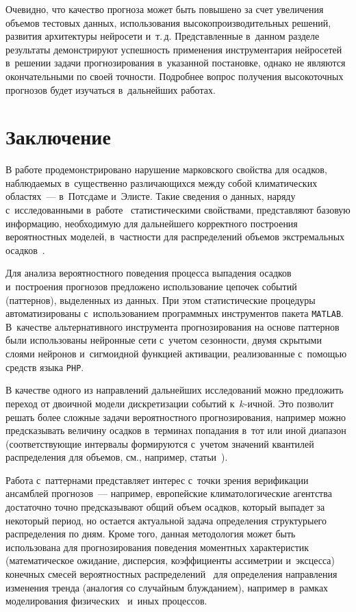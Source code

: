 \begin{multicols}{2}
Очевидно, что качество прогноза может быть повышено за счет увеличения
объемов тестовых данных, использования высокопроизводительных решений,
развития архитектуры нейросети и~т.\,д. Представленные в~данном разделе
результаты демонстрируют успешность применения инструментария нейросетей 
в~решении задачи прогнозирования в~указанной постановке, однако не являются
окончательными по своей точности. Подробнее вопрос получения высокоточных 
прогнозов будет изучаться в~дальнейших работах.

\vspace*{-9pt}

\section{Заключение}

\vspace*{-2pt}

В работе продемонстрировано нарушение марковского свойства для осадков,
наблюдаемых в~существенно различающихся между собой климатических
областях~--- в~Потсдаме и~Элисте. Такие сведения о данных, наряду 
с~исследованными в~работе~\cite{Gorshenin2017b} статистическими свойствами,
представляют базовую информацию, необходимую для дальнейшего корректного
построения вероятностных моделей, в~част\-ности для распределений объемов
экстремальных осадков~\cite{Gorshenin2017a}.

Для анализа вероятностного поведения процесса выпадения осадков 
и~построения прогнозов
предложено использование цепочек событий (паттернов), выделенных из данных.
При этом статистические процедуры автоматизированы с~использованием
программных инструментов пакета \verb"MATLAB". В~качестве альтернативного
инструмента прогнозирования на основе паттернов были использованы нейронные
сети с~учетом сезонности, двумя скрытыми слоями нейронов и~сигмоидной
функцией активации, реализованные с~помощью средств языка \verb"PHP".

В качестве одного из направлений дальнейших исследований можно предложить
переход от двоичной модели дискретизации событий к~$k$-ичной. Это позволит
решать более сложные задачи вероятностного прогнозирования, например можно
предсказывать величину осадков в~терминах попадания в~тот или иной диапазон
(соответствующие интервалы формируются с~учетом значений квантилей
распределения для объемов, см., например,
\mbox{статьи}~\cite{Zolina2009,Gorshenin2017c}).

Работа с~паттернами представляет интерес с~точки зрения верификации
ансамблей прогнозов~--- например, европейские климатологические агентства
достаточно точно предсказывают общий объем осадков, который выпадет за
некоторый период, но остается актуальной задача определения структуры\linebreak его
распределения по дням. Кроме того, данная методология может быть 
использована для прогнозирования поведения моментных 
характеристик (мате\-ма\-ти\-че\-ское ожидание, дисперсия, коэффициенты 
ассиметрии и~эксцесса) конечных смесей вероятностных 
распределений~\cite{Gorshenin2016} для определения направления 
изменения тренда (аналогия со случайным блужданием), 
например в~рамках моделирования физических~\cite{Gorshenin2011} 
и~иных процессов.


\end{multicols}
